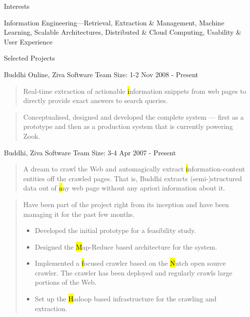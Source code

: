\documentclass{resume}
\newcommand{\teamsize}{\hfill\sc\footnotesize Team Size: }
\begin{document}
\begin{category}{Interests}{}

    \item Information Engineering---Retrieval, Extraction \& Management,
        Machine Learning, Scalable Architectures, Distributed \& Cloud
        Computing, Usability \& User Experience

\end{category}


\begin{category}{Selected Projects}{}

    \item {\topic Buddhi Online,} Ziva Software
        {\teamsize 1-2}
        {\period Nov 2008 - Present}

        \begin{quote}
            Real-time extraction of actionable {\hl information snippets} from
            web pages to directly provide exact answers to search queries.
        \end{quote}

        \begin{quote}
            Conceptualised, designed and developed the complete system ---
            first as a prototype and then as a production system that is
            currently powering Zook.
        \end{quote}

    \item {\topic Buddhi,} Ziva Software
        {\teamsize 3-4}
        {\period Apr 2007 - Present}

        \begin{quote}
            A dream to crawl the Web and automagically extract {\hl
            information-content entities} off the crawled pages.
            That is, Buddhi extracts (semi-)structured data out of {\hl
            any} web page without any apriori information about it.
        \end{quote}

        \begin{quote}
            Have been part of the project right from its inception and have
            been managing it for the past few months.
            \begin{itemize}
                \item Developed the initial prototype for a feasibility study.
                \item Designed the {\hl Map-Reduce} based architecture for the
                    system.
                \item Implemented a {\hl focused crawler} based on the {\hl
                    Nutch} open source crawler. The crawler has been deployed
                    and regularly crawls large portions of the Web.
                \item Set up the {\hl Hadoop} based infrastructure for the
                    crawling and extraction.
            \end{itemize}
        \end{quote}


\end{category}
\end{document}
